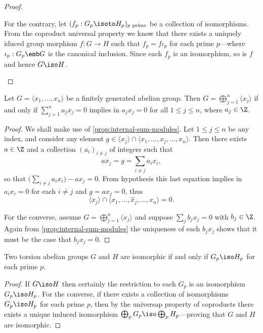 \begin{proof}
\begin{enumerate}[(a)]
              For the contrary, let \((f_p: G_p \isoto H_p)_{p \text{ prime}}\) be a
              collection of isomorphisms. From the coproduct universal property we know that
              there exists a uniquely iduced group morphism \(f: G \to H\) such that \(f_p =
              f \iota_p\) for each prime \(p\)---where \(\iota_p: G_p \emb G\) is the
              canonical inclusion. Since each \(f_p\) is an isomorphism, so is \(f\) and
              hence \(G \iso H\).
    \end{enumerate}
\end{proof}

\begin{lemma}
    \label{lem:grp-independence}
    Let \(G = \langle x_1, \dots, x_n \rangle\) be a finitely generated abelian
    group. Then \(G = \bigoplus_{j=1}^n \langle x_j \rangle\) if and only if
    \(\sum_{j=1}^n a_j x_j = 0\) implies in \(a_j x_j = 0\) for all
    \(1 \leq j \leq n\), where \(a_j \in \Z\).
\end{lemma}

\begin{proof}
    We shall make use of \cref{prop:internal-sum-modules}. Let \(1 \leq j \leq n\)
    be any index, and consider any element
    \(g \in \langle x_j \rangle \cap \langle x_1, \dots, \widehat x_j, \dots, x_n
    \rangle\). Then there exists \(a \in \Z\) and a collection \((a_i)_{i \neq j}\)
    of integers such that
    \[
        a x_j = g = \sum_{i \neq j} a_i x_i,
    \]
    so that \(\big(\sum_{i \neq j} a_i x_i \big) - a x_j = 0\). From hypothesis this
    last equation implies in \(a_i x_i = 0\) for each \(i \neq j\) and
    \(g = a x_j = 0\), thus
    \[
        \langle x_j \rangle
        \cap \langle x_1, \dots, \widehat x_j, \dots, x_n \rangle
        = 0.
    \]

    For the converse, assume \(G = \bigoplus_{j=1}^n \langle x_j \rangle\) and
    suppose \(\sum_j b_j x_j = 0\) with \(b_j \in \Z\). Again from
    \cref{prop:internal-sum-modules} the uniqueness of each \(b_j x_j\) shows that
    it must be the case that \(b_j x_j = 0\).
\end{proof}

\begin{proposition}
    \label{prop:torsion-grp-iso-iff-primary-iso}
    Two torsion abelian groups \(G\) and \(H\) are isomorphic if and only if
    \(G_p \iso H_p\) for each prime \(p\).
\end{proposition}

\begin{proof}
    If \(G \iso H\) then certainly the restriction to each \(G_p\) is an isomorphism
    \(G_p \iso H_p\). For the converse, if there exists a collection of isomorphisms
    \(G_p \iso H_p\) for each prime \(p\), then by the universap property of
    coproducts there exists a unique induced isomorphism
    \(\bigoplus_p G_p \iso \bigoplus_p H_p\)---proving that \(G\) and \(H\) are
    isomorphic.
\end{proof}


